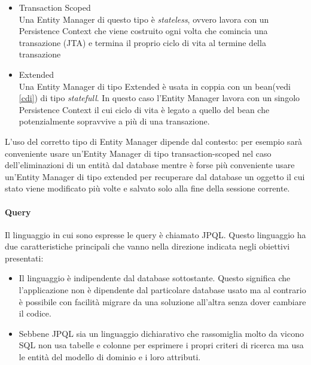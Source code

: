 \begin{itemize}
 \item Transaction Scoped\\
 Una Entity Manager di questo tipo è \textsl{stateless}, ovvero lavora con un Persistence Context che viene costruito ogni volta che comincia una transazione (JTA) e termina il proprio ciclo di vita al termine della transazione
 \item Extended\\
  Una Entity Manager di tipo Extended è usata in coppia con un bean(vedi \ref{cdi}) di tipo \textsl{statefull}. In questo caso l'Entity Manager lavora con un singolo Persistence Context il cui ciclo di vita è legato a quello del bean che potenzialmente sopravvive
  a più di una transazione.
\end{itemize}

L'uso del corretto tipo di Entity Manager dipende dal contesto: per esempio sarà conveniente usare un'Entity Manager di tipo transaction-scoped nel caso dell'eliminazioni di un entità dal database mentre è forse più conveniente usare un'Entity
Manager di tipo extended per recuperare dal database un oggetto il cui stato viene modificato più volte e salvato solo alla fine della sessione corrente.


\paragraph{Query}
Il linguaggio in cui sono espresse le query è chiamato JPQL. Questo linguaggio ha due caratteristiche principali che vanno nella direzione indicata negli obiettivi presentati:

\begin{itemize}
 \item Il linguaggio è indipendente dal database sottostante. Questo significa che l'applicazione non è dipendente dal particolare database usato ma al contrario è possibile con facilità migrare da una soluzione all'altra senza dover cambiare
  il codice.
  \item Sebbene JPQL sia un linguaggio dichiarativo che rassomiglia molto da vicono SQL non usa tabelle e colonne per esprimere i propri criteri di ricerca ma usa le entità del modello di dominio e i loro attributi.
\end{itemize}



